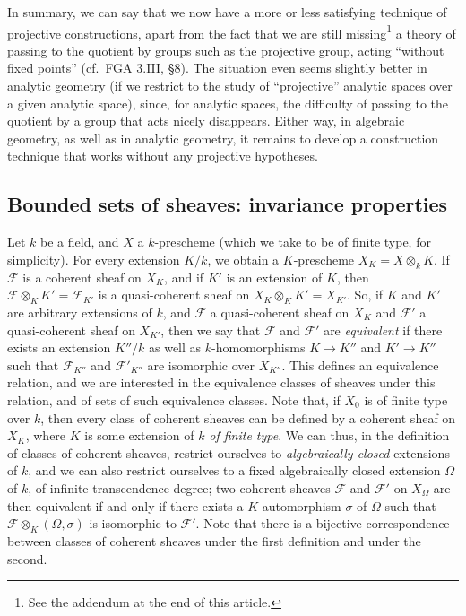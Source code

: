\documentclass{article}
\newcommand{\oldpage}[1]{\marginpar{\footnotesize$\Big\vert$ \textit{p.~#1}}}
\theoremstyle{definition}
\theoremstyle{definition}
\theoremstyle{definition}
\theoremstyle{definition}
\theoremstyle{remark}
\begin{document}
In summary, we can say that we now have a more or less satisfying technique of projective constructions, apart from the fact that we are still missing\footnote{See the addendum at the end of this article.} a theory of passing to the quotient by groups such as the projective group, acting ``without fixed points'' (cf.~\protect\hyperlink{fga-3-iii-section-8}{FGA 3.III, §8}).
The situation even seems slightly better in analytic geometry (if we restrict to the study of ``projective'' analytic spaces over a given analytic space), since, for analytic spaces, the difficulty of passing to the quotient by a group that acts nicely disappears.
Either way, in algebraic geometry, as well as in analytic geometry, it remains to develop a construction technique that works without any projective hypotheses.

\hypertarget{fga-3-iv-section-1}{%
\subsection{Bounded sets of sheaves: invariance properties}\label{fga-3-iv-section-1}}

Let \(k\) be a field, and \(X\) a \(k\)-prescheme (which we take to be of finite type, for simplicity).
For every extension \(K/k\), we obtain a \(K\)-prescheme \(X_K=X\otimes_k K\).
If \({\mathscr{F}}\) is a coherent sheaf on \(X_K\), and if \(K'\) is an extension of \(K\), then \({\mathscr{F}}\otimes_K K'={\mathscr{F}}_{K'}\) is a quasi-coherent sheaf on \(X_K\otimes_KK'=X_{K'}\).
\oldpage{221-02}So, if \(K\) and \(K'\) are arbitrary extensions of \(k\), and \({\mathscr{F}}\) a quasi-coherent sheaf on \(X_K\) and \({\mathscr{F}}'\) a quasi-coherent sheaf on \(X_{K'}\), then we say that \({\mathscr{F}}\) and \({\mathscr{F}}'\) are \emph{equivalent} if there exists an extension \(K''/k\) as well as \(k\)-homomorphisms \(K\to K''\) and \(K'\to K''\) such that \({\mathscr{F}}_{K''}\) and \({\mathscr{F}}'_{K''}\) are isomorphic over \(X_{K''}\).
This defines an equivalence relation, and we are interested in the equivalence classes of sheaves under this relation, and of sets of such equivalence classes.
Note that, if \(X_0\) is of finite type over \(k\), then every class of coherent sheaves can be defined by a coherent sheaf on \(X_K\), where \(K\) is some extension of \(k\) \emph{of finite type}.
We can thus, in the definition of classes of coherent sheaves, restrict ourselves to \emph{algebraically closed} extensions of \(k\), and we can also restrict ourselves to a fixed algebraically closed extension \(\Omega\) of \(k\), of infinite transcendence degree;
two coherent sheaves \({\mathscr{F}}\) and \({\mathscr{F}}'\) on \(X_\Omega\) are then equivalent if and only if there exists a \(K\)-automorphism \(\sigma\) of \(\Omega\) such that \({\mathscr{F}}\otimes_K(\Omega,\sigma)\) is isomorphic to \({\mathscr{F}}'\).
Note that there is a bijective correspondence between classes of coherent sheaves under the first definition and under the second.
\end{document}
